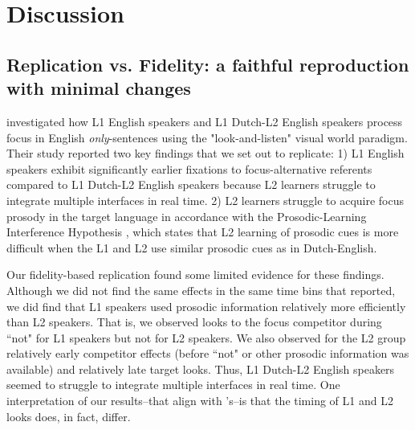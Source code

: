 
\section{Discussion}
\subsection{Replication vs. Fidelity: a faithful reproduction with minimal changes}

\cite{ge2021a} investigated how L1 English speakers and L1 Dutch-L2 English speakers process focus in English \textit{only}-sentences using the "look-and-listen" visual world paradigm. Their study reported two key findings that we set out to replicate: 1) L1 English speakers exhibit significantly earlier fixations to focus-alternative referents compared to L1 Dutch-L2 English speakers because L2 learners struggle to integrate multiple interfaces in real time. 2) L2 learners struggle to acquire focus prosody in the target language in accordance with the Prosodic-Learning Interference Hypothesis \parencite{tremblay2016effects, tremblay2021re}, which states that L2 learning of prosodic cues is more difficult when the L1 and L2 use similar prosodic cues as in Dutch-English.

Our fidelity-based replication found some limited evidence for these findings. Although we did not find the same effects in the same time bins that \cite{ge2021a} reported, we did find that L1 speakers used prosodic information relatively more efficiently than L2 speakers. That is, we observed looks to the focus competitor during ``not" for L1 speakers but not for L2 speakers. We also observed for the L2 group relatively early competitor effects (before ``not" or other prosodic information was available) and relatively late target looks. Thus, L1 Dutch-L2 English speakers seemed to struggle to integrate multiple interfaces in real time. One interpretation of our results--that align with \cite{ge2021a}'s--is that the timing of L1 and L2 looks does, in fact, differ. 

